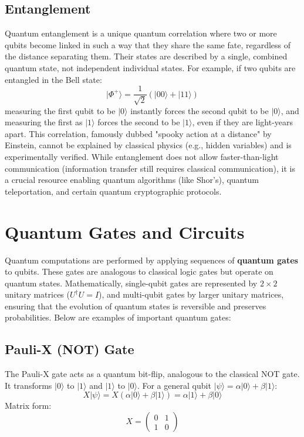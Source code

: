 \subsection{Entanglement}\label{subsec:entanglement}
Quantum entanglement is a unique quantum correlation where two or more qubits become linked in such a way that they share the same fate, regardless of the distance separating them. Their states are described by a single, combined quantum state, not independent individual states. For example, if two qubits are entangled in the Bell state:
\begin{equation*}
    |\Phi^+\rangle = \frac{1}{\sqrt{2}}(|00\rangle + |11\rangle)
\end{equation*}
measuring the first qubit to be $|0\rangle$ instantly forces the second qubit to be $|0\rangle$, and measuring the first as $|1\rangle$ forces the second to be $|1\rangle$, even if they are light-years apart. This correlation, famously dubbed "spooky action at a distance" by Einstein, cannot be explained by classical physics (e.g., hidden variables) and is experimentally verified. While entanglement does not allow faster-than-light communication (information transfer still requires classical communication), it is a crucial resource enabling quantum algorithms (like Shor's), quantum teleportation, and certain quantum cryptographic protocols.

\section{Quantum Gates and Circuits}\label{sec:quantum_gates}

Quantum computations are performed by applying sequences of \textbf{quantum gates} to qubits. These gates are analogous to classical logic gates but operate on quantum states. Mathematically, single-qubit gates are represented by $2 \times 2$ unitary matrices ($U^\dagger U = I$), and multi-qubit gates by larger unitary matrices, ensuring that the evolution of quantum states is reversible and preserves probabilities. Below are examples of important quantum gates:

\subsection*{Pauli-X (NOT) Gate}
The Pauli-X gate acts as a quantum bit-flip, analogous to the classical NOT gate. It transforms $|0\rangle$ to $|1\rangle$ and $|1\rangle$ to $|0\rangle$. For a general qubit $|\psi\rangle = \alpha|0\rangle + \beta|1\rangle$:
\begin{equation*}
    X|\psi\rangle = X(\alpha|0\rangle + \beta|1\rangle) = \alpha|1\rangle + \beta|0\rangle
\end{equation*}
Matrix form:
\begin{equation*}
    X = \begin{pmatrix} 0 & 1 \\ 1 & 0 \end{pmatrix}
\end{equation*}

